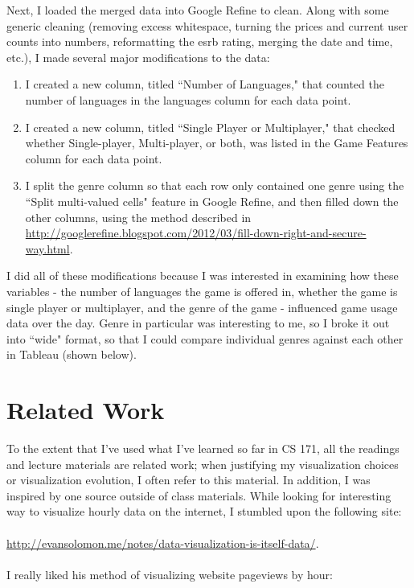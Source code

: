 \documentclass[pdftex,12pt,a4paper]{article}
\begin{document}
Next, I loaded the merged data into Google Refine to clean. Along with some generic cleaning (removing excess whitespace, turning the prices and current user counts into numbers, reformatting the esrb rating, merging the date and time, etc.), I made several major modifications to the data:
\begin{enumerate}
\item I created a new column, titled ``Number of Languages," that counted the number of languages in the languages column for each data point.
\item I created a new column, titled ``Single Player or Multiplayer," that checked whether Single-player, Multi-player, or both, was listed in the Game Features column for each data point.
\item I split the genre column so that each row only contained one genre using the ``Split multi-valued cells" feature in Google Refine, and then filled down the other columns, using the method described in \url{http://googlerefine.blogspot.com/2012/03/fill-down-right-and-secure-way.html}.
\end{enumerate}
I did all of these modifications because I was interested in examining how these variables - the number of languages the game is offered in, whether the game is single player or multiplayer, and the genre of the game - influenced game usage data over the day. Genre in particular was interesting to me, so I broke it out into ``wide" format, so that I could compare individual genres against each other in Tableau (shown below). 

\section{Related Work}
To the extent that I've used what I've learned so far in CS 171, all the readings and lecture materials are related work; when justifying my visualization choices or visualization evolution, I often refer to this material. In addition, I was inspired by one source outside of class materials. While looking for interesting way to visualize hourly data on the internet, I stumbled upon the following site: \\ \\
\url{http://evansolomon.me/notes/data-visualization-is-itself-data/}. \\ \\
I really liked his method of visualizing website pageviews by hour: \\ \\
\end{document}
